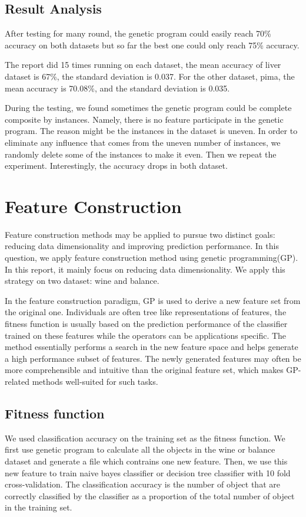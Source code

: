 \documentclass[11pt, a4paper, oneside, openright]{article}
\begin{document}
\subsection{Result Analysis}
After testing for many round, the genetic program could easily reach 70\% accuracy on both datasets but so far the best one could only reach 75\% accuracy.

The report did 15 times running on each dataset,  the mean accuracy of liver dataset is 67\%, the standard deviation is 0.037.          
For the other dataset, pima, the mean accuracy is 70.08\%, and the standard deviation is 0.035.


During the testing, we found sometimes the genetic program could be complete composite by instances. Namely, there is no feature participate in the genetic program.  The reason might be the instances in the dataset is uneven. In order to eliminate any influence that comes from the uneven number of instances, we randomly delete some of the instances to make it even. Then we repeat the experiment. Interestingly, the accuracy drops in both dataset.

\section{Feature Construction}
Feature construction methods may be applied to pursue two distinct goals: reducing data dimensionality and improving prediction performance. In this question, we apply feature construction method using genetic programming(GP). In this report, it mainly focus on reducing data dimensionality. We apply this strategy on two dataset: wine and balance.


In the feature construction paradigm, GP is used to derive a new feature set from the original one. Individuals are often tree like representations of features, the fitness function is usually based on the prediction performance of the classifier trained on these features while the operators can be applications specific. The method essentially performs a search in the new feature space and helps generate a high performance subset of features. The newly generated features may often be more comprehensible and intuitive than the original feature set, which makes GP-related methods well-suited for such tasks.

\subsection{Fitness function}
We used classification accuracy on the training set as the fitness function.  We first use genetic program to calculate all the objects in the wine or balance dataset and generate a file which contrains one new feature. Then, we use this new feature to train naive bayes classifier or decision tree classifier with 10 fold cross-validation.  The classification accuracy is the number of object that are correctly classified by the classifier as a proportion of the total number of object in the training set.
\end{document}

